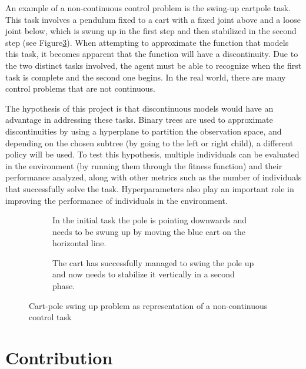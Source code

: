 An example of a non-continuous control problem is the swing-up cartpole task. This task involves a pendulum fixed to a cart with a fixed joint above and a loose joint below, which is swung up in the first step and then stabilized in the second step (see Figure\ref{fig:swing_up}). When attempting to approximate the function that models this task, it becomes apparent that the function will have a discontinuity. Due to the two distinct tasks involved, the agent must be able to recognize when the first task is complete and the second one begins. In the real world, there are many control problems that are not continuous.

The hypothesis of this project is that discontinuous models would have an advantage in addressing these tasks. Binary trees are used to approximate discontinuities by using a hyperplane to partition the observation space, and depending on the chosen subtree (by going to the left or right child), a different policy will be used. To test this hypothesis, multiple individuals can be evaluated in the environment (by running them through the fitness function) and their performance analyzed, along with other metrics such as the number of individuals that successfully solve the task. Hyperparameters also play an important role in improving the performance of individuals in the environment.


\begin{figure}[!ht]
    \centering
    \begin{subfigure}{.48\textwidth}
        \centering
        \caption{In the initial task the pole is pointing downwards and needs to be swung up by moving the blue cart on the horizontal line.} 
        \label{swing_up_initial}
    \end{subfigure}%
    \hspace{1em}
    \begin{subfigure}{.48\textwidth}
        \centering
        \caption{The cart has successfully managed to swing the pole up and now needs to stabilize it vertically in a second phase.} 
        \label{swing_up_running}
    \end{subfigure}
    \caption{Cart-pole swing up problem as representation of a non-continuous control task}
    \label{fig:swing_up}
\end{figure}


\section{Contribution}

